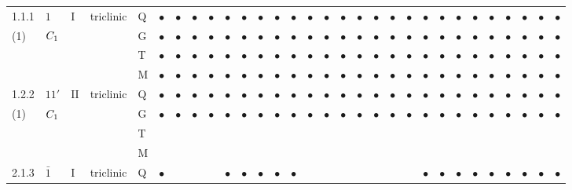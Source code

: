 \documentclass[fleqn,9pt,landscape]{jsarticle}
\begin{document}
\begin{longtable}{lllll|l|lll|ll|lll|l|lll|lll|l|ll|lll|lll}
1.1.1 & \texttt{$1$} & I & triclinic & Q & $\bullet$ & $\bullet$ & $\bullet$ & $\bullet$ & $\bullet$ & $\bullet$ & $\bullet$ & $\bullet$ & $\bullet$ & $\bullet$ & $\bullet$ & $\bullet$ & $\bullet$ & $\bullet$ & $\bullet$ & $\bullet$ & $\bullet$ & $\bullet$ & $\bullet$ & $\bullet$ & $\bullet$ & $\bullet$ & $\bullet$ & $\bullet$ & $\bullet$ \\
(1) & $C_{\rm 1}$ &  &  & G & $\bullet$ & $\bullet$ & $\bullet$ & $\bullet$ & $\bullet$ & $\bullet$ & $\bullet$ & $\bullet$ & $\bullet$ & $\bullet$ & $\bullet$ & $\bullet$ & $\bullet$ & $\bullet$ & $\bullet$ & $\bullet$ & $\bullet$ & $\bullet$ & $\bullet$ & $\bullet$ & $\bullet$ & $\bullet$ & $\bullet$ & $\bullet$ & $\bullet$ \\
 &  &  &  & T & $\bullet$ & $\bullet$ & $\bullet$ & $\bullet$ & $\bullet$ & $\bullet$ & $\bullet$ & $\bullet$ & $\bullet$ & $\bullet$ & $\bullet$ & $\bullet$ & $\bullet$ & $\bullet$ & $\bullet$ & $\bullet$ & $\bullet$ & $\bullet$ & $\bullet$ & $\bullet$ & $\bullet$ & $\bullet$ & $\bullet$ & $\bullet$ & $\bullet$ \\
 &  &  &  & M & $\bullet$ & $\bullet$ & $\bullet$ & $\bullet$ & $\bullet$ & $\bullet$ & $\bullet$ & $\bullet$ & $\bullet$ & $\bullet$ & $\bullet$ & $\bullet$ & $\bullet$ & $\bullet$ & $\bullet$ & $\bullet$ & $\bullet$ & $\bullet$ & $\bullet$ & $\bullet$ & $\bullet$ & $\bullet$ & $\bullet$ & $\bullet$ & $\bullet$ \\ \hline
1.2.2 & \texttt{$11'$} & II & triclinic & Q & $\bullet$ & $\bullet$ & $\bullet$ & $\bullet$ & $\bullet$ & $\bullet$ & $\bullet$ & $\bullet$ & $\bullet$ & $\bullet$ & $\bullet$ & $\bullet$ & $\bullet$ & $\bullet$ & $\bullet$ & $\bullet$ & $\bullet$ & $\bullet$ & $\bullet$ & $\bullet$ & $\bullet$ & $\bullet$ & $\bullet$ & $\bullet$ & $\bullet$ \\
(1) & $C_{\rm 1}$ &  &  & G & $\bullet$ & $\bullet$ & $\bullet$ & $\bullet$ & $\bullet$ & $\bullet$ & $\bullet$ & $\bullet$ & $\bullet$ & $\bullet$ & $\bullet$ & $\bullet$ & $\bullet$ & $\bullet$ & $\bullet$ & $\bullet$ & $\bullet$ & $\bullet$ & $\bullet$ & $\bullet$ & $\bullet$ & $\bullet$ & $\bullet$ & $\bullet$ & $\bullet$ \\
 &  &  &  & T &  &  &  &  &  &  &  &  &  &  &  &  &  &  &  &  &  &  &  &  &  &  &  &  &  \\
 &  &  &  & M &  &  &  &  &  &  &  &  &  &  &  &  &  &  &  &  &  &  &  &  &  &  &  &  &  \\ \hline
2.1.3 & \texttt{$\bar{1}$} & I & triclinic & Q & $\bullet$ &  &  &  & $\bullet$ & $\bullet$ & $\bullet$ & $\bullet$ & $\bullet$ &  &  &  &  &  &  &  & $\bullet$ & $\bullet$ & $\bullet$ & $\bullet$ & $\bullet$ & $\bullet$ & $\bullet$ & $\bullet$ & $\bullet$ \\

\end{longtable}
\end{document}
